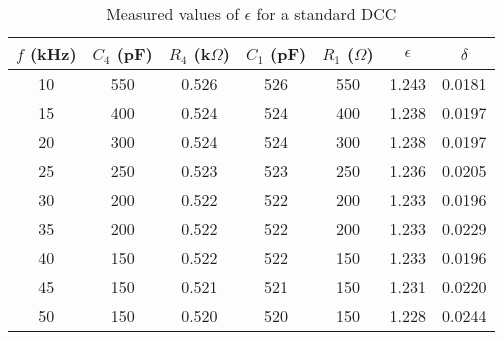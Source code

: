 \begin{table}[H]
    \centering
    \begin{tabular}{|c|c|c|c|c|c|c|}
    \hline
    $f$ (kHz) & $C_4$ (pF) & $R_4$ (k$\Omega$) & $C_1$ (pF) & $R_1$ ($\Omega$) & $\epsilon$ & $\delta$ \\ \hline
    10 & 550 & 0.526 & 526 & 550 & 1.243 & 0.0181 \\ \hline
    15 & 400 & 0.524 & 524 & 400 & 1.238 & 0.0197 \\ \hline
    20 & 300 & 0.524 & 524 & 300 & 1.238 & 0.0197 \\ \hline
    25 & 250 & 0.523 & 523 & 250 & 1.236 & 0.0205 \\ \hline
    30 & 200 & 0.522 & 522 & 200 & 1.233 & 0.0196 \\ \hline
    35 & 200 & 0.522 & 522 & 200 & 1.233 & 0.0229 \\ \hline
    40 & 150 & 0.522 & 522 & 150 & 1.233 & 0.0196 \\ \hline
    45 & 150 & 0.521 & 521 & 150 & 1.231 & 0.0220 \\ \hline
    50 & 150 & 0.520 & 520 & 150 & 1.228 & 0.0244 \\ \hline
    \end{tabular}
    \caption{Measured values of $\epsilon$ for a standard DCC}
    \label{tab:c}
\end{table}